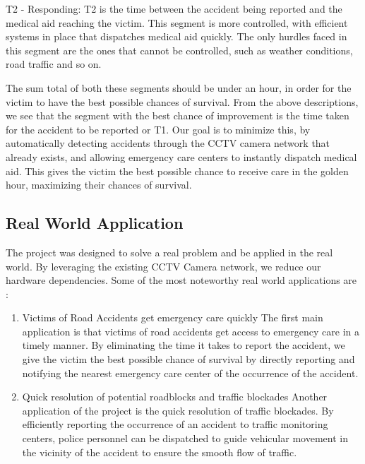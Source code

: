 \documentclass[ 12pt,a4paper,twocolumn,fleqn]{article}
\begin{document}
\begin{adjustwidth}{3.5em}{0pt}
T2 - Responding:
T2 is the time between the accident being reported and the medical aid reaching the victim. This segment is more controlled, with efficient systems in place that dispatches medical aid quickly. The only hurdles faced in this segment are the ones that cannot be controlled, such as weather conditions, road traffic and so on.

The sum total of both these segments should be under an hour, in order for the victim to have the best possible chances
of survival. From the above descriptions, we see that the segment with the best chance of improvement is the time taken for the accident to be reported or T1. Our goal is to minimize this, by automatically detecting accidents through the CCTV camera network that already exists, and allowing emergency care centers to instantly dispatch medical aid. This gives the victim the best possible chance to receive care in the golden hour, maximizing their chances of survival.


\hspace{0.2cm}



\subsection{Real World Application}
The project was designed to solve a real problem and be applied in the real world. By leveraging the existing CCTV Camera network, we reduce our hardware dependencies. Some of the most noteworthy real world applications are :
\begin{enumerate}

  \item {Victims of Road Accidents get emergency care quickly
The first main application is that victims of road accidents get access to emergency care in a timely manner. By eliminating the time it takes to report the accident, we give the victim the best possible chance of survival by directly reporting and notifying the nearest emergency care center of the occurrence of the accident.}

  \item {Quick resolution of potential roadblocks and traffic blockades
Another application of the project is the quick resolution of traffic blockades. By efficiently reporting the occurrence of an accident to traffic monitoring centers, police personnel can be dispatched to guide vehicular movement in the vicinity of the accident to ensure the smooth flow of traffic.}


\end{enumerate}
\end{adjustwidth}
\end{document}
